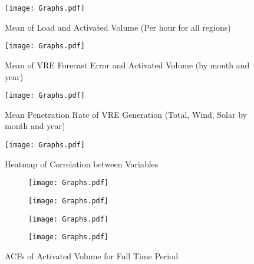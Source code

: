 \documentclass[12pt]{article}
\begin{document}
\begin{appendix}
\newpage
\begin{figure}[!htbp]
    \centering
    \texttt{[image: Graphs.pdf]}
 \caption{Mean of Load and Activated Volume (Per hour for all regions)}
 \label{figure:Evolution Mean of Load and ActVol}
\end{figure}


\newpage
\begin{figure}[!htbp]
  \centering
  \texttt{[image: Graphs.pdf]}
 \caption{Mean of VRE Forecast Error and Activated Volume (by month and year)}
 \label{figure:Evolution of ActVol and RenewError}
\end{figure}


\newpage
\begin{figure}[!htbp]
  \centering
  \texttt{[image: Graphs.pdf]}
 \caption{Mean Penetration Rate of VRE Generation (Total, Wind, Solar by month and year)}
 \label{figure:RenewEvolution}
\end{figure}




\begin{figure}[!htbp]
    \centering
    \texttt{[image: Graphs.pdf]}
    \caption{Heatmap of Correlation between Variables}
    \label{figure:heatmap}
\end{figure}




\newpage
\begin{figure}
\centering
\begin{subfigure}{.5\textwidth}
  \centering
  \texttt{[image: Graphs.pdf]}
\end{subfigure}%
\begin{subfigure}{.5\textwidth}
  \centering
  \texttt{[image: Graphs.pdf]}
\end{subfigure}
\begin{subfigure}{.5\textwidth}
  \centering
  \texttt{[image: Graphs.pdf]}
\end{subfigure}%
\begin{subfigure}{.5\textwidth}
  \centering
  \texttt{[image: Graphs.pdf]}
\end{subfigure}
\caption{ACFs of Activated Volume for Full Time Period}
\label{figure:ACF1}
\end{figure}


\end{appendix}
\end{document}

